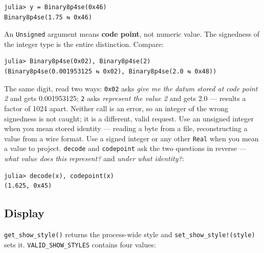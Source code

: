 \label{11779541812791244075}{}



\begin{verbatim}
julia> y = Binary8p4se(0x46)
Binary8p4se(1.75 ⇆ 0x46)
\end{verbatim}



An \texttt{Unsigned} argument means \textbf{code point}, not numeric value. The signedness of the integer type is the entire distinction. Compare:




\nopagebreak[4]
\begin{verbatim}
julia> Binary8p4se(0x02), Binary8p4se(2)
(Binary8p4se(0.001953125 ⇆ 0x02), Binary8p4se(2.0 ⇆ 0x48))
\end{verbatim}



The same digit, read two ways: \texttt{0x02} asks \emph{give me the datum stored at code point 2} and gets 0.001953125; \texttt{2} asks \emph{represent the value 2} and gets 2.0 — results a factor of 1024 apart. Neither call is an error, so an integer of the wrong signedness is not caught; it is a different, valid request. Use an unsigned integer when you mean stored identity — reading a byte from a file, reconstructing a value from a wire format. Use a signed integer or any other \texttt{Real} when you mean a value to project. \texttt{decode} and \texttt{codepoint} ask the two questions in reverse — \emph{what value does this represent?} and \emph{under what identity?}:




\nopagebreak[4]
\begin{verbatim}
julia> decode(x), codepoint(x)
(1.625, 0x45)
\end{verbatim}



\subsection{Display}



\label{12429740135947470305}{}


\texttt{get\_\allowbreak{}show\_\allowbreak{}style()} returns the process-wide style and \texttt{set\_\allowbreak{}show\_\allowbreak{}style!(style)} sets it. \texttt{VALID\_\allowbreak{}SHOW\_\allowbreak{}STYLES} contains four values:




